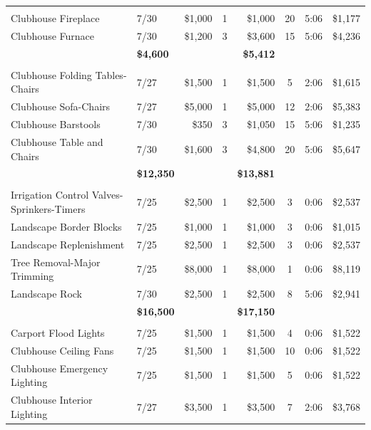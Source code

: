 \documentclass[11pt,letterpaper]{article}
\begin{document}
\begin{longtable}{p{4.2cm} p{1.6cm} r r r c c r}
\addlinespace[6pt]
\multicolumn{8}{l}{\textbf{HVAC}} \\
\rowcolor{blue!12} Clubhouse Fireplace & 7/30 & \$1,000 & 1 & \$1,000 & 20 & 5:06 & \$1,177 \\
Clubhouse Furnace & 7/30 & \$1,200 & 3 & \$3,600 & 15 & 5:06 & \$4,236 \\
\addlinespace[1pt] \multicolumn{4}{r}{} & \textbf{\$4,600} & & & \textbf{\$5,412} \\
\addlinespace[6pt]
\multicolumn{8}{l}{\textbf{Interior Furniture}} \\
\rowcolor{blue!12} Clubhouse Folding Tables-Chairs & 7/27 & \$1,500 & 1 & \$1,500 & 5 & 2:06 & \$1,615 \\
Clubhouse Sofa-Chairs & 7/27 & \$5,000 & 1 & \$5,000 & 12 & 2:06 & \$5,383 \\
\rowcolor{blue!12} Clubhouse Barstools & 7/30 & \$350 & 3 & \$1,050 & 15 & 5:06 & \$1,235 \\
Clubhouse Table and Chairs & 7/30 & \$1,600 & 3 & \$4,800 & 20 & 5:06 & \$5,647 \\
\addlinespace[1pt] \multicolumn{4}{r}{} & \textbf{\$12,350} & & & \textbf{\$13,881} \\
\addlinespace[6pt]
\multicolumn{8}{l}{\textbf{Landscape}} \\
\rowcolor{blue!12} Irrigation Control Valves-Sprinkers-Timers & 7/25 & \$2,500 & 1 & \$2,500 & 3 & 0:06 & \$2,537 \\
Landscape Border Blocks & 7/25 & \$1,000 & 1 & \$1,000 & 3 & 0:06 & \$1,015 \\
\rowcolor{blue!12} Landscape Replenishment & 7/25 & \$2,500 & 1 & \$2,500 & 3 & 0:06 & \$2,537 \\
Tree Removal-Major Trimming & 7/25 & \$8,000 & 1 & \$8,000 & 1 & 0:06 & \$8,119 \\
\rowcolor{blue!12} Landscape Rock & 7/30 & \$2,500 & 1 & \$2,500 & 8 & 5:06 & \$2,941 \\
\addlinespace[1pt] \multicolumn{4}{r}{} & \textbf{\$16,500} & & & \textbf{\$17,150} \\
\addlinespace[6pt]
\multicolumn{8}{l}{\textbf{Lighting}} \\
Carport Flood Lights & 7/25 & \$1,500 & 1 & \$1,500 & 4 & 0:06 & \$1,522 \\
\rowcolor{blue!12} Clubhouse Ceiling Fans & 7/25 & \$1,500 & 1 & \$1,500 & 10 & 0:06 & \$1,522 \\
Clubhouse Emergency Lighting & 7/25 & \$1,500 & 1 & \$1,500 & 5 & 0:06 & \$1,522 \\
\rowcolor{blue!12} Clubhouse Interior Lighting & 7/27 & \$3,500 & 1 & \$3,500 & 7 & 2:06 & \$3,768 \\

\end{longtable}
\end{document}
